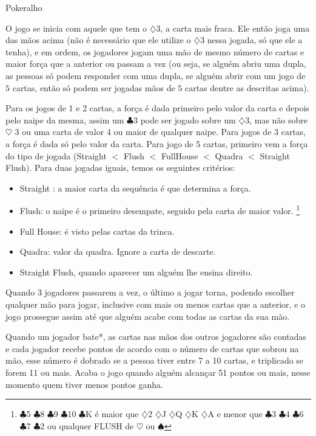 \begin{subsecao}{Pokeralho}
\begin{itemize}
\end{itemize}

O jogo se inicia com aquele que tem o $\diamondsuit$3, a carta mais fraca. Ele
então joga uma das mãos acima (não é necessário que ele utilize
o $\diamondsuit$3 nessa jogada, só que ele a tenha), e em ordem, os jogadores
jogam uma mão de mesmo número de cartas e maior força que a anterior ou passam
a vez (ou seja, se alguém abriu uma dupla, as pessoas só podem responder com
uma dupla, se alguém abrir com um jogo de $5$ cartas, então só podem ser
jogadas mãos de $5$ cartas dentre as descritas acima). 

Para os jogos de 1 e 2 cartas, a força é dada primeiro pelo valor da carta e
depois pelo naipe da mesma, assim um $\clubsuit$3  pode ser jogado sobre
um $\diamondsuit$3, mas não sobre $\heartsuit$ 3 ou uma carta de valor 4 ou
maior de qualquer naipe. Para jogos de 3 cartas, a força é dada só pelo valor
da carta. Para jogo de 5 cartas, primeiro vem a força do tipo de
jogada (Straight $<$ Flush $<$ FullHouse $<$ Quadra $<$ Straight Flush). Para duas
jogadas iguais, temos os seguintes critérios:
\begin{itemize}
	\item Straight : a maior carta da sequência é que determina a força.
	\item Flush: o naipe é o primeiro desempate, seguido pela carta de maior
valor.  \footnote{ $\clubsuit$5 $\clubsuit$8 $\clubsuit$9 $\clubsuit$10 $\clubsuit$K é
maior que $\diamondsuit$2 $\diamondsuit$J $\diamondsuit$Q $\diamondsuit$K
$\diamondsuit$A e menor que $\clubsuit$3 $\clubsuit$4 $\clubsuit$6 $\clubsuit$7
$\clubsuit$2 ou qualquer FLUSH de $\heartsuit$  ou $\spadesuit$ }
	\item Full House: é visto pelas cartas da trinca.	
	\item Quadra: valor da quadra. Ignore a carta de descarte.
	\item Straight Flush, quando aparecer um alguém lhe ensina direito.
\end{itemize}

Quando 3 jogadores passarem a vez, o último a jogar torna, podendo escolher
qualquer mão para jogar, inclusive com mais ou menos cartas que a anterior, e o
jogo prossegue assim até que alguém acabe com todas as cartas da sua mão. 

Quando um jogador bate*, as cartas nas mãos dos outros jogadores são contadas e
cada jogador recebe pontos de acordo com o número de cartas que sobrou na mão,
esse número é dobrado se a pessoa tiver entre 7 a 10 cartas, e triplicado se
forem 11 ou mais. Acaba o jogo quando alguém alcançar 51 pontos ou mais, nesse
momento quem tiver menos pontos ganha.


\end{subsecao}
